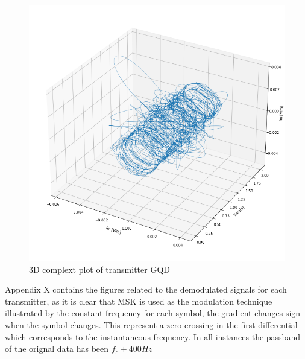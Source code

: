\begin{figure}[h!]
    \centering
    \includegraphics[width = \textwidth]{figs/sig_character/gqd3D.png}
    \caption{3D complext plot of transmitter GQD}
    \label{fig:gqd3d}
\end{figure}


Appendix X contains the figures related to the demodulated signals for each transmitter, as it is clear that MSK is used as the modulation technique illustrated by the constant frequency for each symbol, the gradient changes sign when the symbol changes. This represent a zero crossing in the first differential which corresponds to the instantaneous frequency. In all instances the passband of the orignal data has been $f_c \pm 400Hz$


